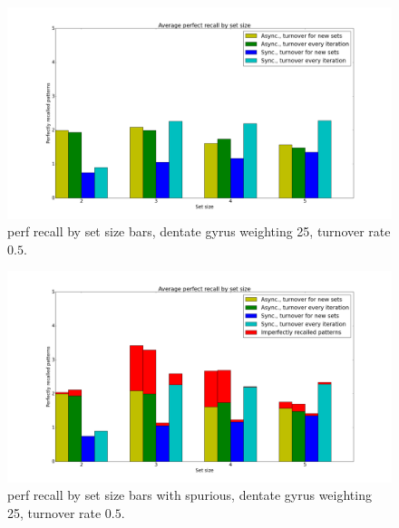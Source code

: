 \begin{figure}[h!]
    \centering
    \includegraphics[width=14cm]{fig/average_perfect_recall_rates_by_set_size_bars_reset_for_every_experiment}
    \caption{perf recall by set size bars, dentate gyrus weighting 25, turnover rate $0.5$.}
    \label{fig:avg_perfect_recall_bars}
\end{figure}

\begin{figure}[h!]
    \centering
    \includegraphics[width=14cm]{fig/average_perfect_recall_rates_by_set_size_bars_reset_for_every_experiment_with_imperfectly_recalled_patterns.png}
    \caption{perf recall by set size bars with spurious, dentate gyrus weighting 25, turnover rate $0.5$.}
    \label{fig:avg_perfect_recall_rates_with_spurious_bars}
\end{figure}


